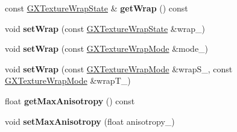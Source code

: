 \begin{DoxyCompactItemize}
\item 
const \hyperlink{class_i_dream_sky_1_1_g_x_texture_wrap_state}{G\+X\+Texture\+Wrap\+State} \& {\bfseries get\+Wrap} () const \hypertarget{class_i_dream_sky_1_1_g_x_texture_aa8b894f04c3e8bcff356a04d6c421178}{}\label{class_i_dream_sky_1_1_g_x_texture_aa8b894f04c3e8bcff356a04d6c421178}

\item 
void {\bfseries set\+Wrap} (const \hyperlink{class_i_dream_sky_1_1_g_x_texture_wrap_state}{G\+X\+Texture\+Wrap\+State} \&wrap\+\_\+)\hypertarget{class_i_dream_sky_1_1_g_x_texture_a3ab4d9befe8ddf20b9ad62c8346a22b8}{}\label{class_i_dream_sky_1_1_g_x_texture_a3ab4d9befe8ddf20b9ad62c8346a22b8}

\item 
void {\bfseries set\+Wrap} (const \hyperlink{class_i_dream_sky_1_1_g_x_texture_wrap_mode}{G\+X\+Texture\+Wrap\+Mode} \&mode\+\_\+)\hypertarget{class_i_dream_sky_1_1_g_x_texture_a5aa6b3a534e3eaae69aacadc43d65dbe}{}\label{class_i_dream_sky_1_1_g_x_texture_a5aa6b3a534e3eaae69aacadc43d65dbe}

\item 
void {\bfseries set\+Wrap} (const \hyperlink{class_i_dream_sky_1_1_g_x_texture_wrap_mode}{G\+X\+Texture\+Wrap\+Mode} \&wrap\+S\+\_\+, const \hyperlink{class_i_dream_sky_1_1_g_x_texture_wrap_mode}{G\+X\+Texture\+Wrap\+Mode} \&wrap\+T\+\_\+)\hypertarget{class_i_dream_sky_1_1_g_x_texture_a79f75badd1d8e0690c3a28682d64c8ba}{}\label{class_i_dream_sky_1_1_g_x_texture_a79f75badd1d8e0690c3a28682d64c8ba}

\item 
float {\bfseries get\+Max\+Anisotropy} () const \hypertarget{class_i_dream_sky_1_1_g_x_texture_a9b28182a23b3bb3011e656203a1cd42c}{}\label{class_i_dream_sky_1_1_g_x_texture_a9b28182a23b3bb3011e656203a1cd42c}

\item 
void {\bfseries set\+Max\+Anisotropy} (float anisotropy\+\_\+)\hypertarget{class_i_dream_sky_1_1_g_x_texture_af6c62d2f3c56d695f055bbdfc383ea93}{}\label{class_i_dream_sky_1_1_g_x_texture_af6c62d2f3c56d695f055bbdfc383ea93}

\end{DoxyCompactItemize}
